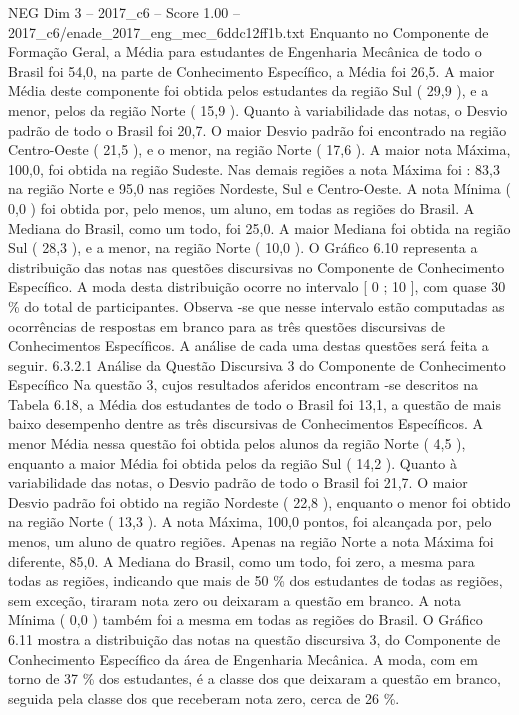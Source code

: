\begin{textsample}{NEG Dim 3 – 2017\_c6 – Score 1.00 – 2017\_c6/enade\_2017\_eng\_mec\_6ddc12ff1b.txt}
Enquanto no Componente de Formação Geral, a Média para estudantes de Engenharia Mecânica de todo o Brasil foi 54,0, na parte de Conhecimento Específico, a Média foi 26,5.
A maior Média deste componente foi obtida pelos estudantes da região Sul ( 29,9 ), e a menor, pelos da região Norte ( 15,9 ).
Quanto à variabilidade das notas, o Desvio padrão de todo o Brasil foi 20,7.
O maior Desvio padrão foi encontrado na região Centro-Oeste ( 21,5 ), e o menor, na região Norte ( 17,6 ).
A maior nota Máxima, 100,0, foi obtida na região Sudeste.
Nas demais regiões a nota Máxima foi : 83,3 na região Norte e 95,0 nas regiões Nordeste, Sul e Centro-Oeste.
A nota Mínima ( 0,0 ) foi obtida por, pelo menos, um aluno, em todas as regiões do Brasil.
A Mediana do Brasil, como um todo, foi 25,0.
A maior Mediana foi obtida na região Sul ( 28,3 ), e a menor, na região Norte ( 10,0 ).
O Gráfico 6.10 representa a distribuição das notas nas questões discursivas no Componente de Conhecimento Específico.
A moda desta distribuição ocorre no intervalo [ 0 ; 10 ], com quase 30 \% do total de participantes.
Observa -se que nesse intervalo estão computadas as ocorrências de respostas em branco para as três questões discursivas de Conhecimentos Específicos.
A análise de cada uma destas questões será feita a seguir. 6.3.2.1 Análise da Questão Discursiva 3 do Componente de Conhecimento Específico Na questão 3, cujos resultados aferidos encontram -se descritos na Tabela 6.18, a Média dos estudantes de todo o Brasil foi 13,1, a questão de mais baixo desempenho dentre as três discursivas de Conhecimentos Específicos.
A menor Média nessa questão foi obtida pelos alunos da região Norte ( 4,5 ), enquanto a maior Média foi obtida pelos da região Sul ( 14,2 ).
Quanto à variabilidade das notas, o Desvio padrão de todo o Brasil foi 21,7.
O maior Desvio padrão foi obtido na região Nordeste ( 22,8 ), enquanto o menor foi obtido na região Norte ( 13,3 ).
A nota Máxima, 100,0 pontos, foi alcançada por, pelo menos, um aluno de quatro regiões.
Apenas na região Norte a nota Máxima foi diferente, 85,0.
A Mediana do Brasil, como um todo, foi zero, a mesma para todas as regiões, indicando que mais de 50 \% dos estudantes de todas as regiões, sem exceção, tiraram nota zero ou deixaram a questão em branco.
A nota Mínima ( 0,0 ) também foi a mesma em todas as regiões do Brasil.
O Gráfico 6.11 mostra a distribuição das notas na questão discursiva 3, do Componente de Conhecimento Específico da área de Engenharia Mecânica.
A moda, com em torno de 37 \% dos estudantes, é a classe dos que deixaram a questão em branco, seguida pela classe dos que receberam nota zero, cerca de 26 \%.

\end{textsample}
